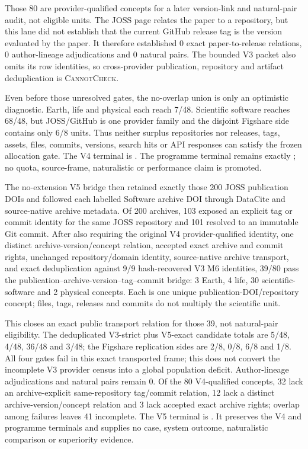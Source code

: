 Those 80 are provider-qualified concepts for a later version-link and
natural-pair audit, not eligible units. The JOSS page relates the paper to a
repository, but this lane did not establish that the current GitHub release tag
is the version evaluated by the paper. It therefore established 0 exact
paper-to-release relations, 0 author-lineage adjudications and 0 natural pairs.
The bounded V3 packet also omits its row identities, so cross-provider
publication, repository and artifact deduplication is \textsc{CannotCheck}.

Even before those unresolved gates, the no-overlap union is only an optimistic
diagnostic. Earth, life and physical each reach 7/48. Scientific software
reaches 68/48, but JOSS/GitHub is one provider family and the disjoint Figshare
side contains only 6/8 units. Thus neither surplus repositories nor releases,
tags, assets, files, commits, versions, search hits or API responses can satisfy
the frozen allocation gate. The V4 terminal is
.
The programme terminal remains exactly
; no quota, source-frame,
naturalistic or performance claim is promoted.

The no-extension V5 bridge then retained exactly those 200 JOSS publication
DOIs and followed each labelled Software archive DOI through DataCite and
source-native archive metadata. Of 200 archives, 103 exposed an explicit tag or
commit identity for the same JOSS repository and 101 resolved to an immutable
Git commit. After also requiring the original V4 provider-qualified identity,
one distinct archive-version/concept relation, accepted exact archive and
commit rights, unchanged repository/domain identity, source-native archive
transport, and exact deduplication against 9/9 hash-recovered V3 M6 identities,
39/80 pass the publication--archive-version--tag--commit bridge: 3 Earth, 4
life, 30 scientific-software and 2 physical concepts. Each is one unique
publication-DOI/repository concept; files, tags, releases and commits do not
multiply the scientific unit.

This closes an exact public transport relation for those 39, not natural-pair
eligibility. The deduplicated V3-strict plus V5-exact candidate totals are
5/48, 4/48, 36/48 and 3/48; the Figshare replication sides are 2/8, 0/8, 6/8
and 1/8. All four gates fail in this exact transported frame; this does not
convert the incomplete V3 provider census into a global population deficit.
Author-lineage adjudications and
natural pairs remain 0. Of the 80 V4-qualified concepts, 32 lack an
archive-explicit same-repository tag/commit relation, 12 lack a distinct
archive-version/concept relation and 3 lack accepted exact archive rights;
overlap among failures leaves 41 incomplete. The V5 terminal is
.
It preserves the V4 and programme terminals and supplies no case, system
outcome, naturalistic comparison or superiority evidence.

